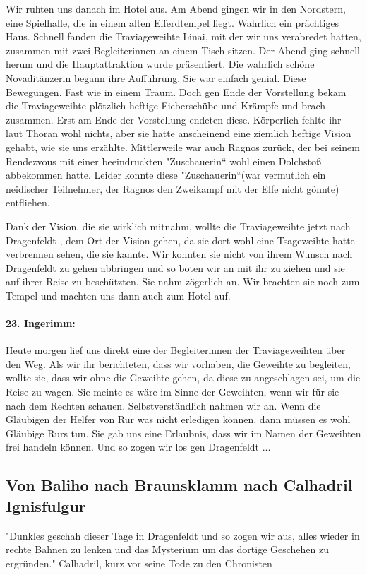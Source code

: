 \documentclass[11pt]{scrreprt}
\begin{document}
Wir ruhten uns danach im Hotel aus. Am Abend gingen wir in den Nordstern, eine Spielhalle, die in einem alten Efferdtempel liegt. Wahrlich ein prächtiges Haus. Schnell fanden die Traviageweihte Linai, mit der wir uns verabredet hatten, zusammen mit zwei Begleiterinnen an einem Tisch sitzen. Der Abend ging schnell herum und die Hauptattraktion wurde präsentiert. Die wahrlich schöne Novaditänzerin begann ihre Aufführung. Sie war einfach genial. Diese Bewegungen. Fast wie in einem Traum. Doch gen Ende der Vorstellung bekam die Traviageweihte plötzlich heftige Fieberschübe und Krämpfe und brach zusammen. Erst am Ende der Vorstellung endeten diese. Körperlich fehlte ihr laut Thoran wohl nichts, aber sie hatte anscheinend eine ziemlich heftige Vision gehabt, wie sie uns erzählte. Mittlerweile war auch Ragnos zurück, der bei seinem Rendezvous mit einer beeindruckten "Zuschauerin“ wohl einen Dolchstoß abbekommen hatte. Leider konnte diese "Zuschauerin“(war vermutlich ein neidischer Teilnehmer, der Ragnos den Zweikampf mit der Elfe nicht gönnte) entfliehen. \par

Dank der Vision, die sie wirklich mitnahm, wollte die Traviageweihte jetzt nach Dragenfeldt , dem Ort der Vision gehen, da sie dort wohl eine Tsageweihte hatte verbrennen sehen, die sie kannte. Wir konnten sie nicht von ihrem Wunsch nach Dragenfeldt zu gehen abbringen und so boten wir an mit ihr zu ziehen und sie auf ihrer Reise zu beschützten. Sie nahm zögerlich an. Wir brachten sie noch zum Tempel und machten uns dann auch zum Hotel auf.

\paragraph{23. Ingerimm:}
Heute morgen lief uns direkt eine der Begleiterinnen der Traviageweihten über den Weg. Als wir ihr berichteten, dass wir vorhaben, die Geweihte zu begleiten, wollte sie, dass wir ohne die Geweihte gehen, da diese zu angeschlagen sei, um die Reise zu wagen. Sie meinte es wäre im Sinne der Geweihten, wenn wir für sie nach dem Rechten schauen. Selbstverständlich nahmen wir an. Wenn die Gläubigen der Helfer von Rur was nicht erledigen können, dann müssen es wohl Gläubige Rurs tun. Sie gab uns eine Erlaubnis, dass wir im Namen der Geweihten frei handeln können. Und so zogen wir los gen Dragenfeldt ...


\subsection{Von Baliho nach Braunsklamm nach Calhadril Ignisfulgur}
"Dunkles geschah dieser Tage in Dragenfeldt  und so zogen wir aus, alles wieder in rechte Bahnen zu lenken und das Mysterium um das dortige Geschehen zu ergründen." 
Calhadril, kurz vor seine Tode zu den Chronisten
\end{document}

